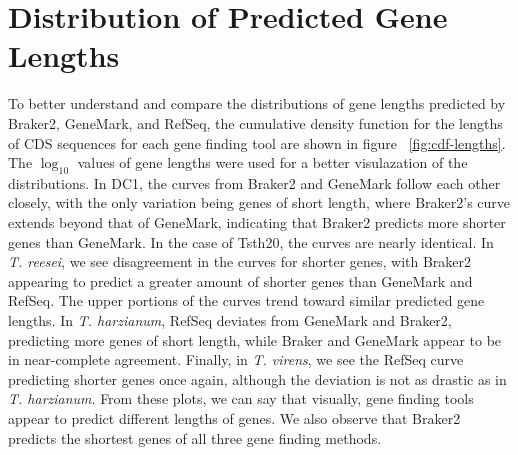 \section{Distribution of Predicted Gene Lengths}

To better understand and compare the distributions of gene lengths
predicted by Braker2, GeneMark, and RefSeq, the cumulative density
function for the lengths of CDS sequences for each gene finding tool
are shown in figure ~\ref{fig:cdf-lengths}. The $\log_{10}$ values of
gene lengths were used for a better visulazation of the
distributions. In DC1, the curves from Braker2 and GeneMark follow
each other closely, with the only variation being genes of short
length, where Braker2's curve extends beyond that of GeneMark,
indicating that Braker2 predicts more shorter genes than GeneMark. In
the case of Tsth20, the curves are nearly identical. In
\textit{T. reesei}, we see disagreement in the curves for shorter
genes, with Braker2 appearing to predict a greater amount of shorter
genes than GeneMark and RefSeq. The upper portions of the curves trend
toward similar predicted gene lengths. In \textit{T. harzianum},
RefSeq deviates from GeneMark and Braker2, predicting more genes of
short length, while Braker and GeneMark appear to be in near-complete
agreement. Finally, in \textit{T. virens}, we see the RefSeq curve
predicting shorter genes once again, although the deviation is not as
drastic as in \textit{T. harzianum}. From these plots, we can say that
visually, gene finding tools appear to predict different lengths of
genes. We also observe that Braker2 predicts the shortest genes of all
three gene finding methods.

